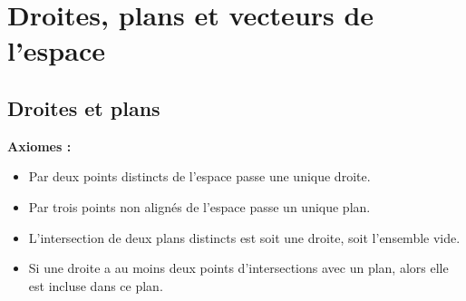 \documentclass[10pt]{article}
\begin{document}
\maketitle

\section{Droites, plans et vecteurs de l'espace}

\subsection{Droites et plans}

\textbf{Axiomes :}
\begin{itemize}
    \item Par deux points distincts de l'espace passe une unique droite.
    \item Par trois points non alignés de l'espace passe un unique plan.
    \item L'intersection de deux plans distincts est soit une droite, soit l'ensemble vide.
    \item Si une droite a au moins deux points d'intersections avec un plan, alors elle est incluse dans ce plan.
\end{itemize}

\end{document}
